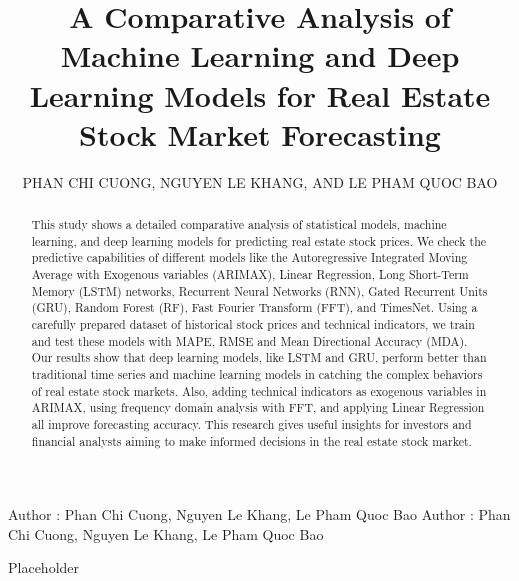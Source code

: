 \documentclass{ieeeojies}
\begin{document}
\title{A Comparative Analysis of Machine Learning and Deep Learning Models for Real Estate Stock Market Forecasting}

\author{\uppercase{Phan Chi Cuong},
\uppercase{Nguyen Le Khang, and Le Pham Quoc Bao}}

\address[1]{Faculty of Information Systems, University of Information Technology, (e-mail: 21520673@gm.uit.edu.vn)}
\address[2]{Faculty of Information Systems, University of Information Technology, (e-mail: 21520960@gm.uit.edu.vn)}
\address[3]{Faculty of Information Systems, University of Information Technology, (e-mail: 21521849@gm.uit.edu.vn)}

\markboth
{Author \headeretal: Phan Chi Cuong, Nguyen Le Khang, Le Pham Quoc Bao}
{Author \headeretal: Phan Chi Cuong, Nguyen Le Khang, Le Pham Quoc Bao}

\begin{abstract}
  This study shows a detailed comparative analysis of statistical models, machine learning, and deep learning models for predicting real estate stock prices. We check the predictive capabilities of different models like the Autoregressive Integrated Moving Average with Exogenous variables (ARIMAX), Linear Regression, Long Short-Term Memory (LSTM) networks, Recurrent Neural Networks (RNN), Gated Recurrent Units (GRU), Random Forest (RF), Fast Fourier Transform (FFT), and TimesNet. Using a carefully prepared dataset of historical stock prices and technical indicators, we train and test these models with MAPE, RMSE and Mean Directional Accuracy (MDA). Our results show that deep learning models, like LSTM and GRU, perform better than traditional time series and machine learning models in catching the complex behaviors of real estate stock markets. Also, adding technical indicators as exogenous variables in ARIMAX, using frequency domain analysis with FFT, and applying Linear Regression all improve forecasting accuracy. This research gives useful insights for investors and financial analysts aiming to make informed decisions in the real estate stock market.
\end{abstract}

\begin{keywords}
  Placeholder
\end{keywords}

\titlepgskip=-15pt

\maketitle
\end{document}
